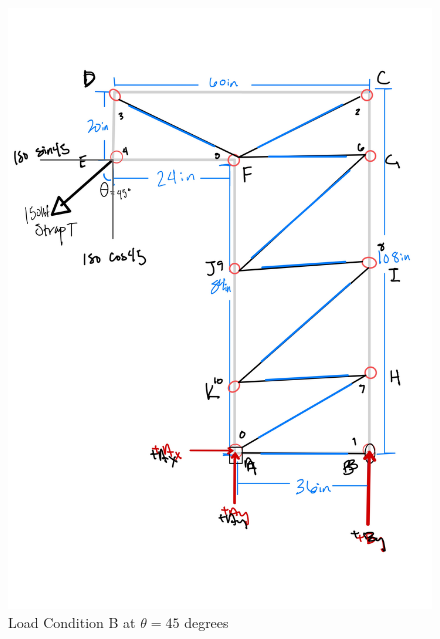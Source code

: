 \begin{figure}
    \centering
    \includegraphics[width=\textwidth]{con2_lcb.jpg}
    \caption{Load Condition B at $\theta = 45$ degrees}
\end{figure}

